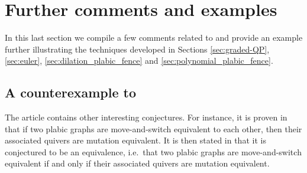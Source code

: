\section{Further comments and examples}\label{sec:comments_and_examples}

In this last section we compile a few comments related to \cite{FPST} and provide an example further illustrating the techniques developed in Sections \ref{sec:graded-QP}, \ref{sec:euler}, \ref{sec:dilation_plabic_fence} and \ref{sec:polynomial_plabic_fence}.

\subsection{A counterexample to \cite[Conjecture 6.17]{FPST}} The article \cite{FPST} contains other interesting conjectures. For instance, it is proven in \cite[Proposition 6.16]{FPST} that if two plabic graphs are move-and-switch equivalent to each other, then their associated quivers are mutation equivalent. It is then stated in \cite[Conjecture 6.17]{FPST} that it is conjectured to be an equivalence, i.e.~that two plabic graphs are move-and-switch equivalent if and only if their associated quivers are mutation equivalent.\\


